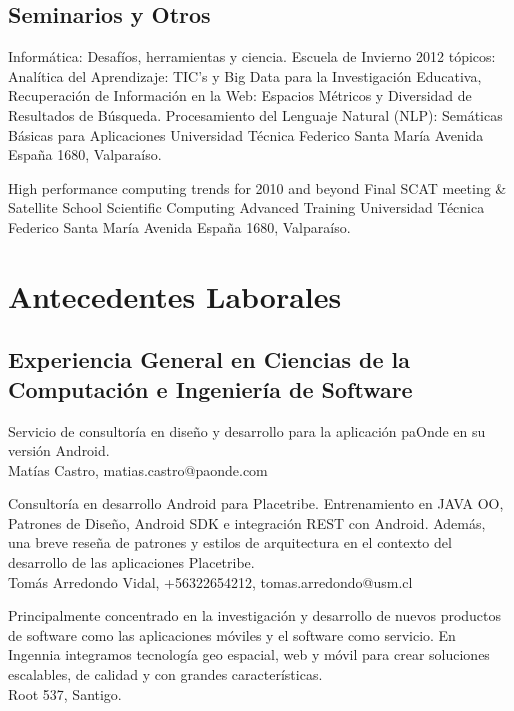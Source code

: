 \documentclass[11pt,letterpaper,roman]{moderncv}
\begin{document}
\subsection{Seminarios y Otros}

 {Informática: Desafíos, herramientas y ciencia.}
{Escuela de Invierno 2012} {tópicos: Analítica del Aprendizaje: TIC's y Big Data
para la Investigación Educativa, Recuperación de Información en la Web: Espacios
Métricos y Diversidad de Resultados de Búsqueda. Procesamiento del Lenguaje
Natural (NLP): Semáticas Básicas para Aplicaciones} {Universidad T\'ecnica
Federico Santa Mar\'ia} {Avenida España 1680, Valpara\'iso.}
	
	
 {High performance computing trends for 2010 and beyond}
{Final SCAT meeting \& Satellite School} {Scientific Computing Advanced
Training} {Universidad T\'ecnica Federico Santa Mar\'ia} {Avenida España 1680,
Valpara\'iso.}


\section{Antecedentes Laborales}

\subsection{Experiencia General en Ciencias de la Computación e Ingeniería de
Software}

 {\scd} {\paonde} {\stgo} {}
{Servicio de consultoría en diseño y desarrollo para la aplicación paOnde en
su versión Android. \\ Matías Castro, matias.castro@paonde.com}

 {\tchr} {\placetribe} {\stgo} {}
{Consultoría en desarrollo Android para Placetribe. Entrenamiento en JAVA OO,
Patrones de Diseño, Android SDK e integración REST con Android. Además, una
breve reseña de patrones y estilos de arquitectura en el contexto del desarrollo
de las aplicaciones Placetribe. \\ Tomás Arredondo Vidal, +56322654212, tomas.arredondo@usm.cl}


 {\cf} {\ingennia} {\stgo} {}
{Principalmente concentrado en la investigación y desarrollo de nuevos productos
de software como las aplicaciones móviles y el software como servicio. En
Ingennia integramos tecnología geo espacial, web y móvil para crear soluciones
escalables, de calidad y con grandes características. \\ Root 537, Santigo.}
\end{document}
